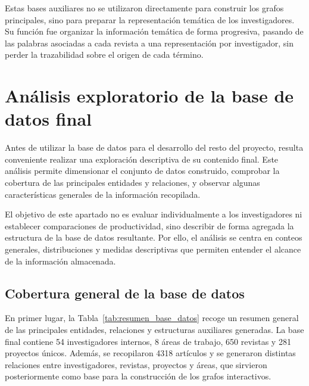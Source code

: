 \documentclass[11pt,spanish,listoffigures,listoftables]{tfgetsinf}
\begin{document}
Estas bases auxiliares no se utilizaron directamente para construir los grafos principales, sino para preparar la representación temática de los investigadores. Su función fue organizar la información temática de forma progresiva, pasando de las palabras asociadas a cada revista a una representación por investigador, sin perder la trazabilidad sobre el origen de cada término.

\section{Análisis exploratorio de la base de datos final}

Antes de utilizar la base de datos para el desarrollo del resto del proyecto, resulta conveniente realizar una exploración descriptiva de su contenido final. Este análisis permite dimensionar el conjunto de datos construido, comprobar la cobertura de las principales entidades y relaciones, y observar algunas características generales de la información recopilada.

El objetivo de este apartado no es evaluar individualmente a los investigadores ni establecer comparaciones de productividad, sino describir de forma agregada la estructura de la base de datos resultante. Por ello, el análisis se centra en conteos generales, distribuciones y medidas descriptivas que permiten entender el alcance de la información almacenada.

\subsection{Cobertura general de la base de datos}

En primer lugar, la Tabla~\ref{tab:resumen_base_datos} recoge un resumen general de las principales entidades, relaciones y estructuras auxiliares generadas. La base final contiene 54 investigadores internos, 8 áreas de trabajo, 650 revistas y 281 proyectos únicos. Además, se recopilaron 4318 artículos y se generaron distintas relaciones entre investigadores, revistas, proyectos y áreas, que sirvieron posteriormente como base para la construcción de los grafos interactivos.
\end{document}
